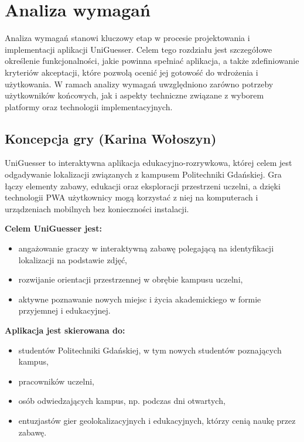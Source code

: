\chapter{Analiza wymagań}
\label{chap:algs}

Analiza wymagań stanowi kluczowy etap w procesie projektowania i implementacji aplikacji UniGuesser. Celem tego rozdziału jest szczegółowe określenie funkcjonalności, jakie powinna spełniać aplikacja, a także zdefiniowanie kryteriów akceptacji, które pozwolą ocenić jej gotowość do wdrożenia i użytkowania. W ramach analizy wymagań uwzględniono zarówno potrzeby użytkowników końcowych, jak i aspekty techniczne związane z wyborem platformy oraz technologii implementacyjnych.

\section{Koncepcja gry (Karina Wołoszyn) }

UniGuesser to interaktywna aplikacja edukacyjno-rozrywkowa, której celem jest odgadywanie lokalizacji związanych z kampusem Politechniki Gdańskiej. Gra łączy elementy zabawy, edukacji oraz eksploracji przestrzeni uczelni, a dzięki technologii PWA użytkownicy mogą korzystać z niej na komputerach i urządzeniach mobilnych bez konieczności instalacji.

\bigskip
\noindent
\textbf{Celem UniGuesser jest:}
\begin{itemize}
    \item angażowanie graczy w interaktywną zabawę polegającą na identyfikacji lokalizacji na podstawie zdjęć,
    \item rozwijanie orientacji przestrzennej w obrębie kampusu uczelni,
    \item aktywne poznawanie nowych miejsc i życia akademickiego w formie przyjemnej i edukacyjnej.
\end{itemize}

\bigskip
\noindent
\textbf{Aplikacja jest skierowana do:}
\begin{itemize}
    \item studentów Politechniki Gdańskiej, w tym nowych studentów poznających kampus,
    \item pracowników uczelni,
    \item osób odwiedzających kampus, np. podczas dni otwartych,
    \item entuzjastów gier geolokalizacyjnych i edukacyjnych, którzy cenią naukę przez zabawę.
\end{itemize}

